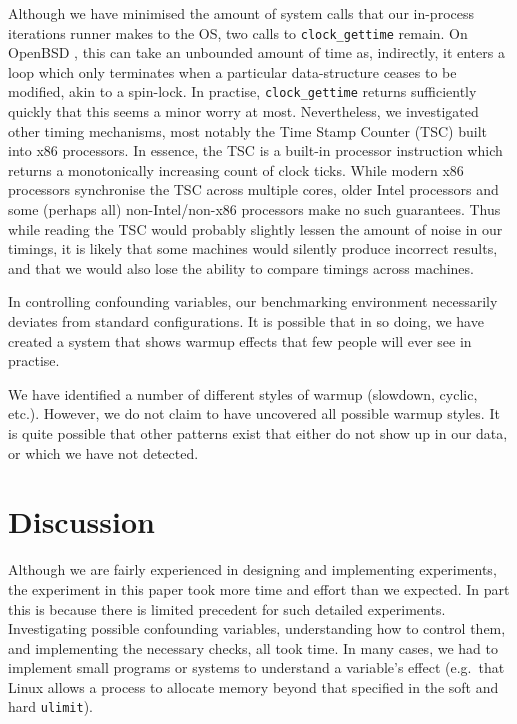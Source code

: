 \documentclass[preprint,numbers,10pt]{sigplanconf}
\begin{document}
Although we have minimised the amount of system calls that our in-process
iterations runner makes to the OS, two calls to \texttt{clock\_gettime} remain.
On OpenBSD , this can take an
unbounded amount of time as, indirectly, it enters a loop which only terminates
when a particular data-structure ceases to be modified, akin to a spin-lock. In
practise, \texttt{clock\_gettime} returns sufficiently quickly that this seems a
minor worry at most. Nevertheless, we investigated other timing mechanisms, most
notably the Time Stamp Counter (TSC) built into x86 processors. In essence,
the TSC is a built-in processor instruction which returns a monotonically
increasing count of clock ticks. While modern x86 processors synchronise the
TSC across multiple cores, older Intel processors and some (perhaps all)
non-Intel/non-x86 processors make no such guarantees. Thus while reading the TSC would
probably slightly lessen the amount of noise in our timings, it is likely that
some machines would silently produce incorrect results, and that we would also
lose the ability to compare timings across machines.

In controlling confounding variables, our benchmarking environment necessarily
deviates from standard configurations. It is possible that in so doing, we have
created a system that shows warmup effects that few people will ever see in
practise.

We have identified a number of different styles of warmup (slowdown, cyclic,
etc.). However, we do not claim to have uncovered all possible warmup styles. It
is quite possible that other patterns exist that either do not show up in our
data, or which we have not detected.


\section{Discussion}
\label{sec:Discussion}

Although we are fairly experienced in designing and implementing
experiments, the experiment in this paper took more time and effort than we
expected. In part this is because there is limited precedent for such detailed
experiments. Investigating possible confounding variables, understanding how to
control them, and implementing the necessary checks, all took time. In many
cases, we had to implement small programs or systems to understand a variable's
effect (e.g.~that Linux allows a process to allocate memory beyond that
specified in the soft and hard \texttt{ulimit}).
\end{document}
